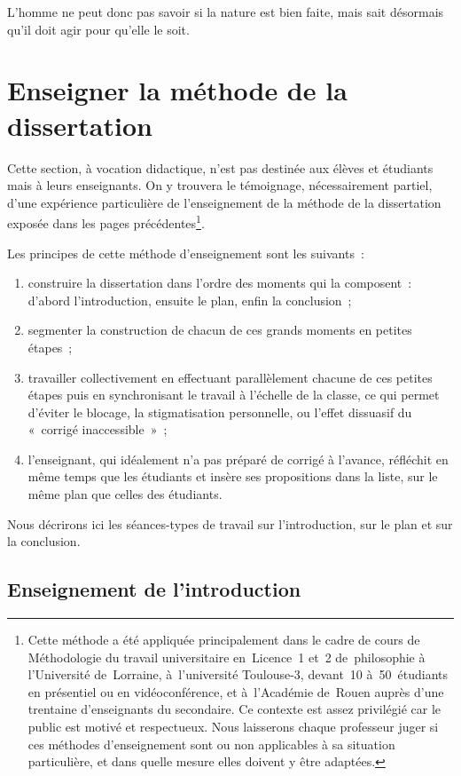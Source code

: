 \documentclass[a4paper,12pt]{report}
\begin{document}
L'homme ne peut donc pas savoir si la nature
est bien faite, mais sait désormais qu'il doit agir pour qu'elle le
soit.

\part{Enseigner la méthode de la dissertation}
\label{sec:org94e99b2}
Cette section, à vocation didactique, n'est pas destinée aux élèves et
étudiants mais à leurs enseignants. On y trouvera le témoignage,
nécessairement partiel, d'une expérience particulière de l'enseignement
de la méthode de la dissertation exposée dans les pages
précédentes\footnote{Cette méthode a été appliquée principalement dans le cadre de
cours de Méthodologie du travail universitaire en Licence 1 et 2
de philosophie à l'Université de Lorraine, à l'université Toulouse-3,
devant 10 à 50 étudiants en présentiel ou en vidéoconférence, et
à l'Académie de Rouen auprès d'une trentaine d'enseignants du
secondaire. Ce contexte est assez privilégié car le public est motivé et
respectueux. Nous laisserons chaque professeur juger si ces méthodes
d'enseignement sont ou non applicables à sa situation particulière, et
dans quelle mesure elles doivent y être adaptées.}.

Les principes de cette méthode d'enseignement sont les suivants :
\begin{enumerate}
\item construire la dissertation dans l'ordre des moments qui la
composent : d'abord l'introduction, ensuite le plan, enfin la
conclusion ;
\item segmenter la construction de chacun de ces grands moments en petites
étapes ;
\item travailler collectivement en effectuant parallèlement chacune de ces
petites étapes puis en synchronisant le travail à l'échelle de la
classe, ce qui permet d'éviter le blocage, la stigmatisation
personnelle, ou l'effet dissuasif du « corrigé inaccessible » ;
\item l'enseignant, qui idéalement n'a pas préparé de corrigé à l'avance,
réfléchit en même temps que les étudiants et insère ses propositions
dans la liste, sur le même plan que celles des étudiants.
\end{enumerate}

Nous décrirons ici les séances-types de travail sur l'introduction, sur
le plan et sur la conclusion.

\chapter{Enseignement de l'introduction}
\label{sec:orgcf696c7}
\end{document}
